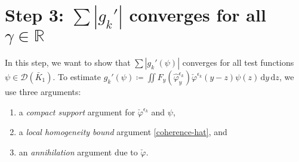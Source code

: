 \section{Step 3: \texorpdfstring{$\sum |g_k'|$ converges for all $\gamma \in \mathbb{R}$}{Sum gk converges for all real gamma}}\label{chapter:step-3}

In this step, we want to show that $\sum |g_k'(\psi)|$ converges for all test functions $\psi \in \mathcal{D}(\bar K_1)$. To estimate $g_k'(\psi) \coloneqq \iint F_y(\hat{\varphi}^{\epsilon_k}_{y}) \check \varphi^{\epsilon_k}(y-z) \psi(z) \, \mathrm{d}y \, \mathrm{d}z$, we use three arguments: 
\begin{enumerate}
    \item a \emph{compact support} argument for $\check \varphi^{\epsilon_k}$ and $\psi$, 
    \item a \emph{local homogeneity bound} argument \eqref{coherence-hat}, and
    \item an \emph{annihilation} argument due to $\check \varphi$.
\end{enumerate}

